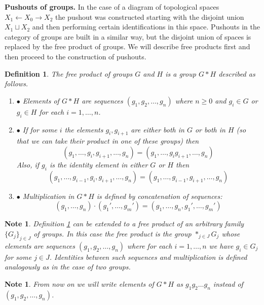\documentclass[11pt, letterpaper, oneside]{report}
\theoremstyle{pplain}
\theoremstyle{ddefinition}
\newtheorem{definition}[theorem]{Definition}
\newtheorem{note}[theorem]{Note}
\theoremstyle{nnn}
\theoremstyle{eexercise}
\newcommand{\la}{\leftarrow}
\newcommand{\benu}{\begin{enumerate}}
\newcommand{\eenu}{\end{enumerate}}
\begin{document}
\textbf{Pushouts of groups.}  
In the case of a diagram of topological spaces $X_{1}\la X_{0} \to X_{2}$
the pushout was constructed starting with the disjoint union $X_{1}\sqcup X_{2}$ and then performing
certain identifications in this space. Pushouts in the category of groups are built in a similar way, 
but the disjoint union of spaces is replaced by the free product of groups. We will describe 
free products first and then proceed to the construction of pushouts.  


\begin{definition}
\label{FREE PROD GPS DEF}
The \emph{free product} of groups $G$ and $H$ is a group $G\!\ast\! H$ described as follows. 
\benu
\item[$\bullet$] Elements  of $G\!\ast\! H$ are sequences $(g_{1}, g_{2}, \dots,  g_{n})$ where $n\geq 0$ and $g_{i}\in G$  or $g_{i}\in H$ for each $i= 1, \dots, n$. 
\item[$\bullet$] If for some $i$ the elements $g_{i}, g_{i+1}$ are either both in $G$ or both in $H$ 
(so that we can take their product in one of these groups) then 
$$(g_{1}, \dots, g_{i} , g_{i+1}, \dots, g_{n}) = (g_{1}, \dots, g_{i}g_{i+1}, \dots, g_{n})$$ 
Also, if $g_{i}$ is the identity element in either $G$ or $H$ then 
$$(g_{1}, \dots, g_{i-1}, g_{i}, g_{i+1}, \dots, g_{n}) = (g_{1}, \dots, g_{i-1}, g_{i+1}, \dots, g_{n})$$ 
\item[$\bullet$] Multiplication in $G\!\ast\! H$ is defined by concatenation of sequences:
$$(g_{1}, \dots, g_{n})\cdot (g_{1}', \dots, g_{m}') = (g_{1}, \dots, g_{n}, g_{1}', \dots, g_{m}')$$
\eenu
\end{definition}


\begin{note}
Definition \ref{FREE PROD GPS DEF} can be extended to a free product of an arbitrary family 
$\{G_{j}\}_{j\in J}$ of groups. In this case the free product is the group $\ast_{j\in J} G_{j}$
whose elements are sequences $(g_{1}, g_{2}, \dots,  g_{n})$ where for each $i= 1, \dots, n$ 
we have $g_{i}\in G_{j}$ for some $j\in J$. Identities between such sequences and multiplication 
is defined analogously as in the case of two groups. 
\end{note}

\begin{note}
From now on we will write elements of $G\!\ast\! H$ as $g_{1}g_{2}\dots g_{n}$ instead of 
$(g_{1}, g_{2}, \dots,  g_{n})$. 
\end{note}
\end{document}

